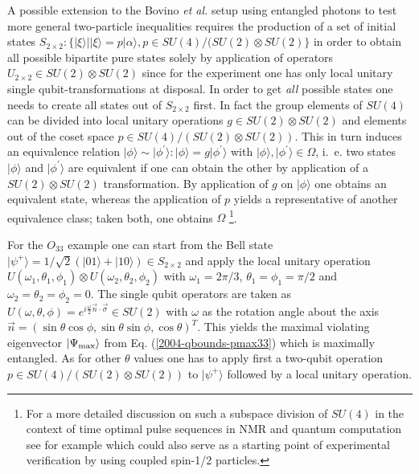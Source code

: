 \documentclass[prl,showpacs,showkeys,amsfonts,amsmath,twocolumn]{revtex4}
\newcommand{\ket}[1]{|#1\rangle}
\begin{document}
A
possible extension to the Bovino \emph{et al.} \cite{bovino-2003}
setup using entangled photons to test more general two-particle inequalities requires the
production of a set of initial states $S_{2\times 2}:\{\ket{\xi}| \ket{\xi} = p \ket{\alpha}, p \in
SU(4)/(SU(2) \otimes SU(2)\}$ 
in order to obtain all possible bipartite
pure states solely by application of operators $U_{2\times 2} \in SU(2) \otimes
SU(2)$ since for the experiment one has only local unitary single
qubit-transformations at disposal. In
order to get \emph{all} possible states one needs to create all states out of
$S_{2\times 2}$ first. 
In fact the group elements of $SU(4)$ can be divided
into local unitary operations $g \in SU(2) \otimes SU(2)$ and elements
out of the coset space $p \in SU(4)/(SU(2) \otimes
SU(2))$. 
This in turn induces an equivalence relation 
$\ket{\phi} \sim \ket{\phi^\prime}: \ket{\phi} = g
\ket{\phi^\prime}$ with $\ket{\phi},\ket{\phi^\prime} \in \Omega$,
i.~e. two states $\ket{\phi}$ and $\ket{\phi^\prime}$ are equivalent if one can
obtain the other by application of a $SU(2) \otimes SU(2)$
transformation. By application of $g$ on $\ket{\phi}$ one obtains an equivalent
state, whereas the application of $p$ yields a representative of
another equivalence class; taken both, one obtains $\Omega$ \footnote{For a more detailed
discussion on such a subspace division of $SU(4)$ in the context of time optimal pulse sequences in NMR and
quantum computation see for example
\cite{khaneja-2001} which could also serve as a starting point of
experimental verification by using coupled spin-1/2 particles.}.

For the $O_{33}$ example one can start from the Bell state
$\ket{\psi^+} = 1/\sqrt{2}(\ket{01} + \ket{10}) \in S_{2\times 2}$ and
apply the local unitary operation $U(\omega_1,\theta_1,\phi_1)\otimes
U(\omega_2,\theta_2,\phi_2)$ with $\omega_1 =2\pi/3$,
$\theta_1=\phi_1=\pi/2$ and $\omega_2=\theta_2=\phi_2=0$. The single
qubit operators are taken as $U(\omega,\theta,\phi) =
e^{i\frac{\omega}{2} \vec{n}\cdot\vec{\sigma}} \in SU(2)$ with
$\omega$ as the rotation angle about the axis $\vec{n}=
(\sin\theta\cos\phi,\sin\theta\sin\phi,\cos\theta)^T$.
This yields the maximal violating eigenvector
$\ket{\Psi_{\rm max}}$ from
Eq. (\ref{2004-qbounds-pmax33}) which is maximally entangled. As for
other $\theta$ values one has to apply first a two-qubit operation $p \in
SU(4)/(SU(2)\otimes SU(2))$ to $\ket{\psi^+}$ followed by a local
unitary operation.
\end{document}
